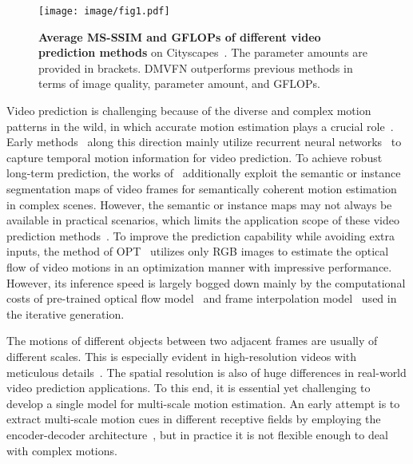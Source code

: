 \documentclass[10pt,twocolumn,letterpaper]{article}
\begin{document}
\begin{figure}[tb]
	\centering
	\texttt{[image: image/fig1.pdf]}
	\caption{
\textbf{Average MS-SSIM and GFLOPs of different video prediction methods} on Cityscapes~\cite{cityscapes}. The parameter amounts are provided in brackets. DMVFN outperforms previous methods in terms of image quality, parameter amount, and GFLOPs.
}
	\label{fig:performance}
\end{figure}

Video prediction is challenging because of the diverse and complex motion patterns in the wild, in which accurate motion estimation plays a crucial role~\cite{prednet,mcnet,dvf}.
Early methods~\cite{prednet,mcnet} along this direction mainly utilize recurrent neural networks~\cite{hochreiter1997long} to capture temporal motion information for video prediction. To achieve robust long-term prediction, the works of~\cite{seg2vid,vid2vid,fvs} additionally exploit the semantic or instance segmentation maps of video frames for semantically coherent motion estimation in complex scenes. However, the semantic or instance maps may not always be available in practical scenarios, which limits the application scope of these video prediction methods~\cite{seg2vid,vid2vid,fvs}. To improve the prediction capability while avoiding extra inputs, the method of OPT~\cite{wu2022optimizing} utilizes only RGB images to estimate the optical flow of video motions in an optimization manner with impressive performance. However, its inference speed is largely bogged down mainly by the computational costs of pre-trained optical flow model~\cite{raft} and frame interpolation model~\cite{rife} used in the iterative generation.

The motions of different objects between two adjacent frames are usually of different scales. This is especially evident in high-resolution videos with meticulous details~\cite{xvfi}. The spatial resolution is also of huge differences in real-world video prediction applications. To this end, it is essential yet challenging to develop a single model for multi-scale motion estimation. An early attempt is to extract multi-scale motion cues in different receptive fields by employing the encoder-decoder architecture~\cite{dvf}, but in practice it is not flexible enough to deal with complex motions.
\end{document}
